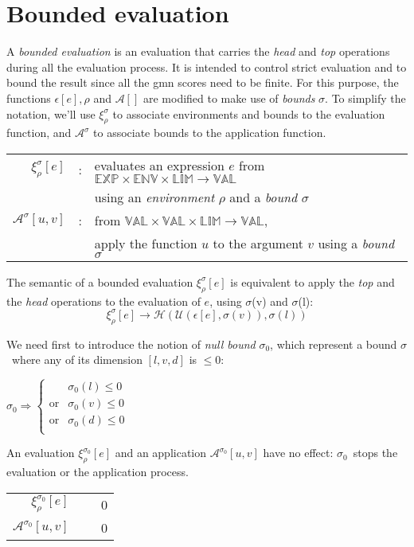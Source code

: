 \documentclass[10pt,a4paper,frenchb]{article}
\newcommand{\expr}		{\ensuremath{\mathbb{EXP}}}
\newcommand{\val}		{\ensuremath{\mathbb{VAL}}}
\newcommand{\env}		{\ensuremath{\mathbb{ENV}}}
\newcommand{\bounddomain}{\ensuremath{\mathbb{LIM}}}
\newcommand{\edomain}[3]{$#1 \times #2 \times \bounddomain \rightarrow #3$}
\newcommand{\evalsym}			{\ensuremath{\epsilon}}
\newcommand{\boundevalsym}	{\ensuremath{\xi}}
\newcommand{\envsym}			{\ensuremath{\rho}}
\newcommand{\applysym}		{\ensuremath{\mathcal A}}
\newcommand{\boundapplysym}[1]	{\ensuremath{\applysym^{#1}}}
\newcommand{\eval}[1]					{\boundevalsym_\envsym^{#1}}
\newcommand{\evalexpr}[2][\bounds]	{\eval{#1}\left[#2\right]}
\newcommand{\evalsimpleshort}[1]		{\evalsym\left[#1\right]}
\newcommand{\evalsimple}[1]			{\evalsym\left[#1\right],\rho}
\newcommand{\apply}[3][\bounds]		{\boundapplysym{#1}\left[#2,#3\right]}
\newcommand{\result}[2]				{#1}
\newcommand{\ra}	{\ensuremath{\rightarrow}}
\newcommand{\head}			{\ensuremath{\mathcal H}}
\renewcommand{\top}		{\ensuremath{\mathcal U}}
\newcommand{\bounds}		{\ensuremath{\sigma}}
\newcommand{\nullbounds}	{\ensuremath{\sigma_0}}
\begin{document}
\section{Bounded evaluation}

A \emph{bounded evaluation} is an evaluation that carries the \emph{head} and \emph{top} operations during all the evaluation process. 
It is intended to control strict evaluation and to bound the result since all the gmn scores need to be finite.
For this purpose, the functions $\evalsimple{e}$ and $\applysym[]$ are modified to make use of \emph{bounds} $\bounds$. To simplify the notation, we'll use $\eval{\bounds}$ to associate environments and bounds to the evaluation function, and $\boundapplysym{\bounds}$ to associate bounds to the application function. 
\begin{center}
\begin{tabular}{rcl}
$\evalexpr{e}$ & : & evaluates an expression $e$ from \edomain{\expr}{\env}{\val} \\
		  & & using an \emph{environment} $\envsym$ and a \emph{bound} $\bounds$ \\
$\apply{u}{v}$  & : & from \edomain{\val}{\val}{\val}, \\
			& & apply the function $u$ to the argument $v$ using a \emph{bound} $\bounds$ \\
\end{tabular}
\end{center}

The semantic of a bounded evaluation $\evalexpr{e}$ is equivalent to apply the \emph{top} and the \emph{head} operations to the evaluation of $e$, using \bounds(v) and \bounds(l):
\begin{equation}
\label{equiv}
 \evalexpr{e} \rightarrow \head( \top( \evalsimpleshort{e}, \bounds(v)), \bounds(l))
\end{equation}

We need first to introduce the notion of \emph{null bound} \nullbounds, which represent a bound \bounds \ where any of its dimension  $[l, v, d]$ is $\leq 0$:
\begin{center}
$\nullbounds \Rightarrow \left\{ \begin{array}{ll}
 										 &  \nullbounds(l) \leq 0 \\
 								\mathrm{or} &  \nullbounds(v) \leq 0 \\
 								\mathrm{or} &  \nullbounds(d) \leq 0 \\
	 							\end{array} \right.$
\end{center}
An evaluation $\evalexpr[\nullbounds]{e}$ and an application $\apply[\nullbounds]{u}{v}$ have no effect: \nullbounds \ stops the evaluation or the application process.
\begin{center}
\begin{tabular}{rc@{\ra}l}
 $\evalexpr[\nullbounds]{e}$ 		& & \ $\result{0}{\bounds(l:=0, v:=0, d:=0)}$ \\
 $\apply[\nullbounds]{u}{v}$  		& & \ $\result{0}{\bounds(l:=0, v:=0, d:=0)}$
\end{tabular}
\end{center}
\end{document}
